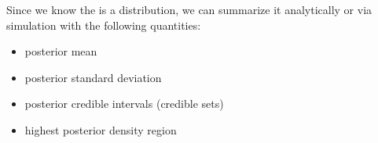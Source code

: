 \documentclass[handout]{beamer}
\begin{document}
\begin{frame}
Since we know the  is a 
distribution, we can summarize it analytically or via simulation with
the following quantities:
\pause
\bigskip
\begin{itemize}
\item posterior mean
\pause
\item posterior standard deviation
\pause 
\item posterior credible intervals (credible sets)
\pause
\item highest posterior density region
\end{itemize} 
\end{frame}

\begin{frame}




\begin{figure}[!htp]
\\
\end{figure}
\end{frame}
\end{document}
